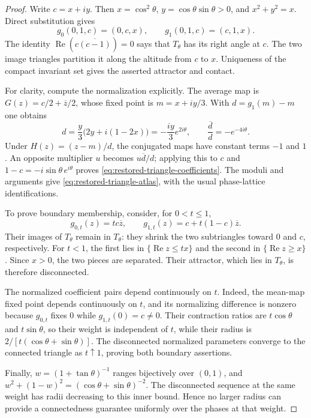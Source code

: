 \begin{proof}
Write $c=x+iy$. Then $x=\cos^2\theta$, $y=\cos\theta\sin\theta>0$,
and $x^2+y^2=x$. Direct substitution gives
\[
 g_0(0,1,c)=(0,c,x),\qquad
 g_1(0,1,c)=(c,1,x).
\]
The identity $\operatorname{Re}(c\overline{(c-1)})=0$ says that
$T_\theta$ has its right angle at $c$. The two image triangles
partition it along the altitude from $c$ to $x$. Uniqueness of
the compact invariant set gives the asserted attractor and contact.

For clarity, compute the normalization explicitly. The average map
is $G(z)=c/2+\overline z/2$, whose fixed point is
$m=x+iy/3$. With $d=g_1(m)-m$ one obtains
\[
 d=\frac y3\bigl(2y+i(1-2x)\bigr)
   =-\frac{iy}{3}e^{2i\theta},\qquad
 \frac{\overline d}{d}=-e^{-4i\theta}.
\]
Under $H(z)=(z-m)/d$, the conjugated maps have constant terms $-1$ and $1$.
An opposite multiplier $u$ becomes $u\overline d/d$; applying this
to $c$ and $1-c=-i\sin\theta\,e^{i\theta}$ proves
\eqref{eq:restored-triangle-coefficients}. The moduli and arguments
give \eqref{eq:restored-triangle-atlas}, with the usual phase-lattice
identifications.

To prove boundary membership, consider, for $0<t\le1$,
\[
 g_{0,t}(z)=tc\overline z,\qquad
 g_{1,t}(z)=c+t(1-c)\overline z.
\]
Their images of $T_\theta$ remain in $T_\theta$: they shrink the
two subtriangles toward $0$ and $c$, respectively. For $t<1$,
the first lies in $\{\operatorname{Re}z\le tx\}$ and the second
in $\{\operatorname{Re}z\ge x\}$. Since $x>0$, the two pieces
are separated. Their attractor, which lies in $T_\theta$, is
therefore disconnected.

The normalized coefficient pairs depend continuously on $t$.
Indeed, the mean-map fixed point depends continuously on $t$,
and its normalizing difference is nonzero because $g_{0,t}$ fixes
$0$ while $g_{1,t}(0)=c\ne0$. Their contraction ratios are
$t\cos\theta$ and $t\sin\theta$, so their weight is independent
of $t$, while their radius is
$2/[t(\cos\theta+\sin\theta)]$.
The disconnected normalized parameters converge to the connected
triangle as $t\uparrow1$, proving both boundary assertions.

Finally, $w=(1+\tan\theta)^{-1}$ ranges bijectively over $(0,1)$,
and
$w^2+(1-w)^2=(\cos\theta+\sin\theta)^{-2}$.
The disconnected sequence at the same weight has radii decreasing
to this inner bound. Hence no larger radius can provide a
connectedness guarantee uniformly over the phases at that weight.
\end{proof}

